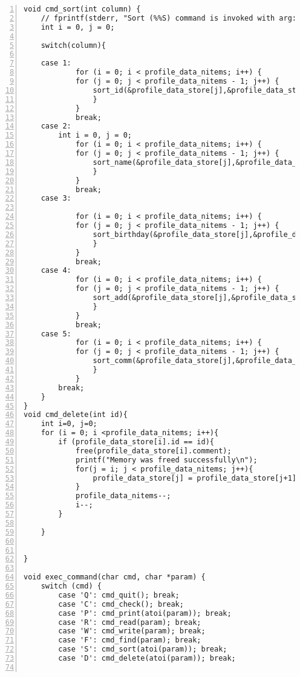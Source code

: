 \begin{Verbatim}[numbers=left, xleftmargin=10mm, numbersep=6pt,
                    fontsize=\small, baselinestretch=0.8]
void cmd_sort(int column) {
    // fprintf(stderr, "Sort (%%S) command is invoked with arg: '%d'\n", column);
    int i = 0, j = 0;
 
    switch(column){

    case 1:
            for (i = 0; i < profile_data_nitems; i++) {
            for (j = 0; j < profile_data_nitems - 1; j++) {
                sort_id(&profile_data_store[j],&profile_data_store[j+1]);
                }
            }
            break;
    case 2:
        int i = 0, j = 0;
            for (i = 0; i < profile_data_nitems; i++) {
            for (j = 0; j < profile_data_nitems - 1; j++) {
                sort_name(&profile_data_store[j],&profile_data_store[j+1]);
                }
            }
            break;
    case 3:
        
            for (i = 0; i < profile_data_nitems; i++) {
            for (j = 0; j < profile_data_nitems - 1; j++) {
                sort_birthday(&profile_data_store[j],&profile_data_store[j+1]);
                }
            }
            break;
    case 4:
            for (i = 0; i < profile_data_nitems; i++) {
            for (j = 0; j < profile_data_nitems - 1; j++) {
                sort_add(&profile_data_store[j],&profile_data_store[j+1]);
                }
            }
            break;
    case 5:
            for (i = 0; i < profile_data_nitems; i++) {
            for (j = 0; j < profile_data_nitems - 1; j++) {
                sort_comm(&profile_data_store[j],&profile_data_store[j+1]);
                }
            }
        break;
    }
}
void cmd_delete(int id){
    int i=0, j=0;
    for (i = 0; i <profile_data_nitems; i++){
        if (profile_data_store[i].id == id){
            free(profile_data_store[i].comment);
            printf("Memory was freed successfully\n");
            for(j = i; j < profile_data_nitems; j++){
                profile_data_store[j] = profile_data_store[j+1];
            }
            profile_data_nitems--;
            i--;
        }

    }
   

}

void exec_command(char cmd, char *param) {
    switch (cmd) {
        case 'Q': cmd_quit(); break;
        case 'C': cmd_check(); break;
        case 'P': cmd_print(atoi(param)); break;
        case 'R': cmd_read(param); break;
        case 'W': cmd_write(param); break;
        case 'F': cmd_find(param); break;
        case 'S': cmd_sort(atoi(param)); break;
        case 'D': cmd_delete(atoi(param)); break;


\end{Verbatim}
